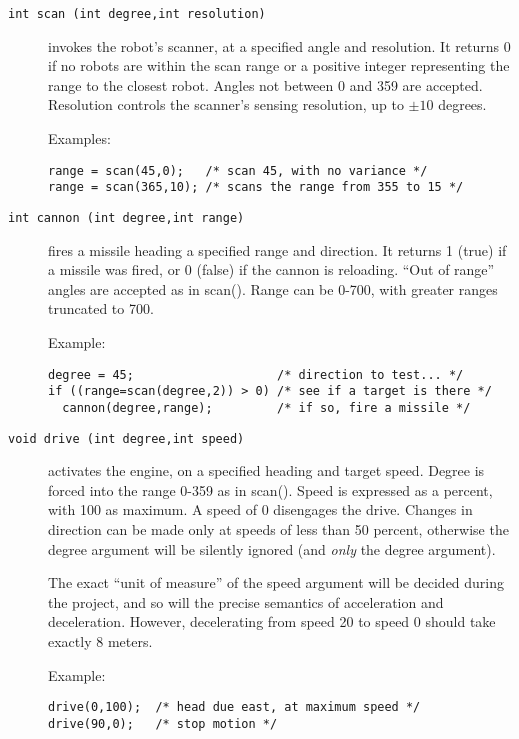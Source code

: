 \documentclass{article}
\begin{document}
\begin{description}
\item[\texttt{int scan (int degree,int resolution)}]
        invokes the robot's scanner, at a specified
        angle and resolution.  It returns 0 if no robots are
        within the scan range or a positive integer representing the
        range to the closest robot.  Angles not between 0 and 359 are accepted.
        Resolution controls the scanner's sensing resolution, up to
        $\pm 10$ degrees.

        Examples:
\begin{verbatim}
range = scan(45,0);   /* scan 45, with no variance */
range = scan(365,10); /* scans the range from 355 to 15 */
\end{verbatim}

\item[\texttt{int cannon (int degree,int range)}]
        fires a missile heading a specified range
        and direction.  It returns 1 (true) if a missile was fired,
        or 0 (false) if the cannon is reloading.  ``Out of range'' angles
        are accepted as in scan().  Range can be 0-700, with greater
        ranges truncated to 700.

        Example:
\begin{verbatim}
degree = 45;                    /* direction to test... */
if ((range=scan(degree,2)) > 0) /* see if a target is there */
  cannon(degree,range);         /* if so, fire a missile */
\end{verbatim}

\item[\texttt{void drive (int degree,int speed)}]
        activates the engine, on a 
        specified heading and target speed.  Degree is forced into the range
        0-359 as in scan().  Speed is expressed as a percent, with 100 as
        maximum.  A speed of 0 disengages the drive.  Changes in
        direction can be made only at speeds of less than 50 percent,
        otherwise the degree argument will be silently ignored (and \emph{only}
        the degree argument).

        The exact ``unit of measure'' of the speed argument will be
        decided during the project, and so will the precise semantics of
        acceleration and deceleration.  However, decelerating from speed
        20 to speed 0 should take exactly 8 meters.

        Example:
\begin{verbatim}
drive(0,100);  /* head due east, at maximum speed */
drive(90,0);   /* stop motion */
\end{verbatim}


\end{description}
\end{document}
